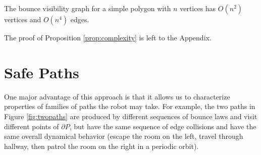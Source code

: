 \documentclass[]{styles/svproc}  %
\begin{document}
\begin{proposition} \label{prop:complexity}
The bounce visibility graph for a simple polygon with $n$ vertices has 
$O(n^2)$ vertices and $O(n^4)$ edges.
\end{proposition}

The proof of Proposition \ref{prop:complexity} is left to the Appendix.

%
%

\section{Safe Paths} \label{sec:safe}

One major advantage of this approach is that it allows us to characterize
properties of families of paths the robot may take. For example, the  
two paths in Figure \ref{fig:twopaths} are produced by different sequences of
bounce laws and visit different points of $\partial P$, but have the same sequence of edge collisions and have the same overall
dynamical behavior (escape the room on the left, travel through hallway, then
patrol the room on the right in a periodic orbit).
\end{document}
